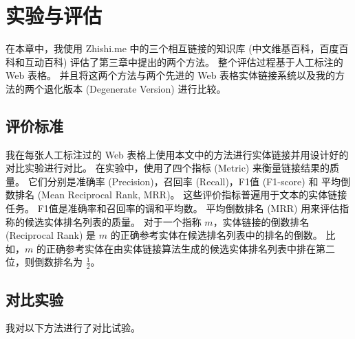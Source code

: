 \chapter{实验与评估}
在本章中，我使用 Zhishi.me 中的三个相互链接的知识库 (中文维基百科，百度百科和互动百科) 评估了第三章中提出的两个方法。
整个评估过程基于人工标注的 Web 表格。
并且将这两个方法与两个先进的 Web 表格实体链接系统以及我的方法的两个退化版本 (Degenerate Version) 进行比较。

\section{评价标准}
我在每张人工标注过的 Web 表格上使用本文中的方法进行实体链接并用设计好的对比实验进行对比。
在实验中，使用了四个指标 (Metric) 来衡量链接结果的质量。
它们分别是准确率 (Precision)，召回率 (Recall)，F1值 (F1-score) 和 平均倒数排名 (Mean Reciprocal Rank\cite{craswell2009mean}, MRR)。
这些评价指标普遍用于文本的实体链接任务\cite{bhagavatula2015tabel}。
F1值是准确率和召回率的调和平均数。
平均倒数排名 (MRR) 用来评估指称的候选实体排名列表的质量。
对于一个指称 $m$，实体链接的倒数排名 (Reciprocal Rank) 是 $m$ 的正确参考实体在候选排名列表中的排名的倒数。
比如，$m$ 的正确参考实体在由实体链接算法生成的候选实体排名列表中排在第二位，则倒数排名为 $\frac{1}{2}$。


\section{对比实验}
我对以下方法进行了对比试验。

